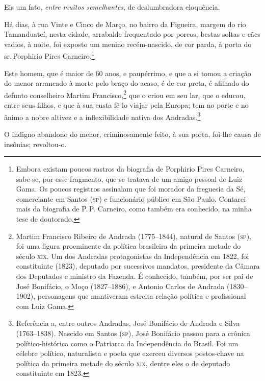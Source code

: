 {Eis um fato, \emph{entre muitos semelhantes}, de deslumbradora
eloquência.

Há dias, à rua Vinte e Cinco de Março, no bairro da Figueira, margem do
rio Tamanduateí, nesta cidade, arrabalde frequentado por porcos, bestas
soltas e cães vadios, à noite, foi exposto um menino recém-nascido, de
cor parda, à porta do sr.\,Porphirio Pires Carneiro.\footnote{Embora
  existam poucos rastros da biografia de Porphirio Pires Carneiro,
  sabe-se, por esse fragmento, que se tratava de um amigo pessoal de
  Luiz Gama. Os poucos registros assinalam que foi morador da
  freguesia da Sé, comerciante em Santos (\textsc{sp}) e funcionário público em
  São Paulo. Contarei mais da biografia de P.\,P. Carneiro, como também
  era conhecido, na minha tese de doutorado.} %

Este homem, que é maior de 60 anos, e paupérrimo, e que a si tomou a
criação do menor arrancado à morte pelo braço do acaso, é de cor preta,
é afilhado do defunto conselheiro Martim Francisco,\footnote{Martim
  Francisco Ribeiro de Andrada (1775--1844), natural de Santos (\textsc{sp}), foi
  uma figura proeminente da política brasileira da primeira metade do
  século \textsc{xix}. Um dos Andradas protagonistas da Independência em 1822,
  foi constituinte (1823), deputado por sucessivos mandatos, presidente
  da Câmara dos Deputados e ministro da Fazenda. É conhecido, também,
  por ser pai de José Bonifácio, o Moço (1827--1886), e Antonio Carlos de
  Andrada (1830--1902), personagens que mantiveram estreita relação
  política e profissional com Luiz Gama.} que o criou em seu lar, que o
educou, entre seus filhos, e que à sua custa fê-lo viajar pela Europa;
tem no porte e no ânimo a nobre altivez e a inflexibilidade nativa dos
Andradas.\footnote{Referência a, entre outros Andradas, José Bonifácio
  de Andrada e Silva (1763--1838). Nascido em Santos (\textsc{sp}), José Bonifácio
  passou para a crônica político-histórica como o Patriarca da
  Independência do Brasil. Foi um célebre político, naturalista e poeta
  que exerceu diversos postos-chave na política da primeira metade do
  século \textsc{xix}, dentre eles o de deputado constituinte em 1823.}

O indigno abandono do menor, criminosamente feito, à sua porta, foi-lhe
causa de insônias; revoltou-o.

}
